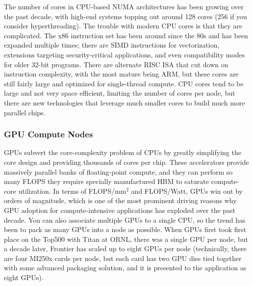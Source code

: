The number of cores in \gls{CPU}-based \gls{NUMA} architectures has been growing over the past decade, with high-end systems topping out around 128 cores (256 if you consider hyperthreading).
The trouble with modern \gls{CPU} cores is that they are complicated.
The x86 instruction set has been around since the 80s and has been expanded multiple times; there are \gls{SIMD} instructions for vectorization, extensions targeting security-critical applications, and even compatibility modes for older 32-bit programs. 
There are alternate RISC \gls{ISA} that cut down on instruction complexity, with the most mature being ARM, but these cores are still fairly large and optimized for single-thread compute.
\gls{CPU} cores tend to be large and not very space efficient, limiting the number of cores per node, but there are new technologies that leverage much smaller cores to build much more parallel chips. 

\subsubsection{GPU Compute Nodes}

\gls{GPU}s subvert the core-complexity problem of \gls{CPU}s by greatly simplifying the core design and providing thousands of cores per chip. 
These accelerators provide massively parallel banks of floating-point compute, and they can perform so many \gls{FLOPS} they require specially manufactured \gls{HBM} to saturate compute-core utilization.
In terms of \gls{FLOPS}/mm$^2$ and \gls{FLOPS}/Watt, \gls{GPU}s win out by orders of magnitude, which is one of the most prominent driving reasons why \gls{GPU} adoption for compute-intensive applications has exploded over the past decade.
You can also associate multiple \gls{GPU}s to a single \gls{CPU}, so the trend has been to pack as many \gls{GPU}s into a node as possible.
When \gls{GPU}s first took first place on the Top500 with Titan at \gls{ORNL}, there was a single \gls{GPU} per node, but a decade later, Frontier has scaled up to eight \gls{GPU}s per node (technically, there are four MI250x cards per node, but each card has two \gls{GPU} dies tied together with some advanced packaging solution, and it is presented to the application as eight \gls{GPU}s).

